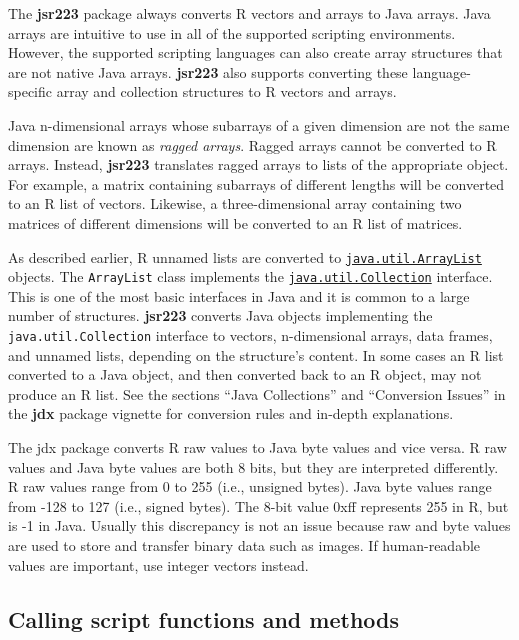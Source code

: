 \documentclass[
article,
11pt, %
a4paper, %
oneside, %
headinclude,footinclude, %
]{scrartcl}
\theoremstyle{definition} %
\theoremstyle{plain} %
\theoremstyle{remark} %
\newcommand{\pkg}[1]{\textbf{#1}}
\newcommand{\code}[1]{\texttt{#1}}
\newcommand{\dfn}[1]{{\normalfont\textsl{#1}}}
\begin{document}
The \pkg{jsr223} package always converts R vectors and arrays to Java arrays. Java arrays are intuitive to use in all of the supported scripting environments. However, the supported scripting languages can also create array structures that are not native Java arrays. \pkg{jsr223} also supports converting these language-specific array and collection structures to R vectors and arrays.

Java n-dimensional arrays whose subarrays of a given dimension are not the same dimension are known as \dfn{ragged arrays}. Ragged arrays cannot be converted to R arrays. Instead, \pkg{jsr223} translates ragged arrays to lists of the appropriate object. For example, a matrix containing subarrays of different lengths will be converted to an R list of vectors. Likewise, a three-dimensional array containing two matrices of different dimensions will be converted to an R list of matrices.

As described earlier, R unnamed lists are converted to \href{https://docs.oracle.com/javase/8/docs/api/java/util/ArrayList.html}{\code{java.util.ArrayList}} objects. The \code{ArrayList} class implements the \href{https://docs.oracle.com/javase/8/docs/api/java/util/Collection.html}{\code{java.util.Collection}} interface. This is one of the most basic interfaces in Java and it is common to a large number of structures. \pkg{jsr223} converts Java objects implementing the \code{java.util.Collection} interface to vectors, n-dimensional arrays, data frames, and unnamed lists, depending on the structure's content. In some cases an R list converted to a Java object, and then converted back to an R object, may not produce an R list. See the sections ``Java Collections'' and ``Conversion Issues'' in the \pkg{jdx} package vignette for conversion rules and in-depth explanations.

The jdx package converts R raw values to Java byte values and vice versa. R raw values and Java byte values are both 8 bits, but they are interpreted differently. R raw values range from 0 to 255 (i.e., unsigned bytes). Java byte values range from -128 to 127 (i.e., signed bytes). The 8-bit value 0xff represents 255 in R, but is -1 in Java. Usually this discrepancy is not an issue because raw and byte values are used to store and transfer binary data such as images. If human-readable values are important, use integer vectors instead.

\subsection{Calling script functions and methods}
\end{document}
